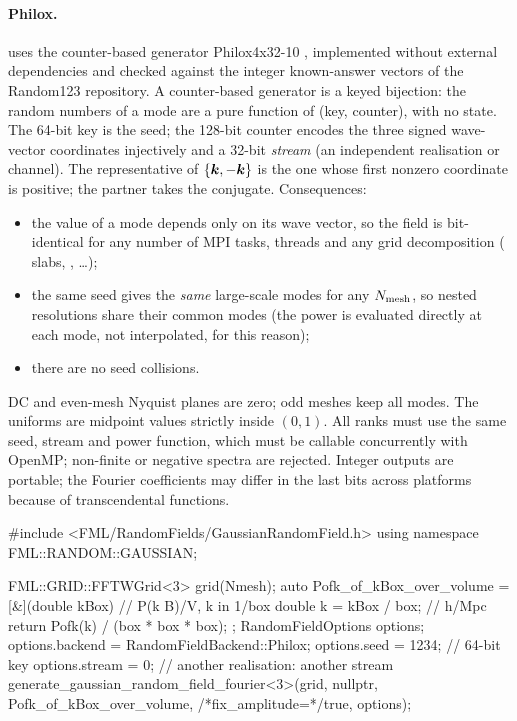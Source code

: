 \paragraph*{Philox.}  uses the counter-based generator Philox4x32-10
\cite{Salmon2011}, implemented without external dependencies and checked against the integer known-answer vectors of
the Random123 repository. A counter-based generator is a keyed bijection: the random numbers of a mode are a pure
function of (key, counter), with no state. The 64-bit key is the seed; the 128-bit counter encodes the three signed
wave-vector coordinates injectively and a 32-bit \emph{stream} (an independent realisation or channel). The
representative of $\{\bm{k},-\bm{k}\}$ is the one whose first nonzero coordinate is positive; the partner takes the
conjugate. Consequences:
\begin{itemize}
\item the value of a mode depends only on its wave vector, so the field is bit-identical for any number of MPI
      tasks, threads and any grid decomposition ( slabs, , \ldots);
\item the same seed gives the \emph{same} large-scale modes for any $N_{\rm mesh}$, so nested resolutions share their
      common modes (the power is evaluated directly at each mode, not interpolated, for this reason);
\item there are no seed collisions.
\end{itemize}
DC and even-mesh Nyquist planes are zero; odd meshes keep all modes. The uniforms are midpoint values strictly inside
$(0,1)$. All ranks must use the same seed, stream and power function, which must be callable concurrently with
OpenMP; non-finite or negative spectra are rejected. Integer outputs are portable; the Fourier coefficients may differ
in the last bits across platforms because of transcendental functions.

\begin{cppcode}
#include <FML/RandomFields/GaussianRandomField.h>
using namespace FML::RANDOM::GAUSSIAN;

FML::GRID::FFTWGrid<3> grid(Nmesh);
auto Pofk_of_kBox_over_volume = [&](double kBox) {      // P(k B)/V, k in 1/box
    double k = kBox / box;                               // h/Mpc
    return Pofk(k) / (box * box * box);
};
RandomFieldOptions options;
options.backend = RandomFieldBackend::Philox;
options.seed    = 1234;     // 64-bit key
options.stream  = 0;        // another realisation: another stream
generate_gaussian_random_field_fourier<3>(grid, nullptr, Pofk_of_kBox_over_volume,
                                          /*fix_amplitude=*/true, options);
\end{cppcode}


